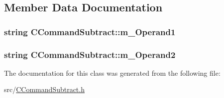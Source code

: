 \subsection{Member Data Documentation}
\subsubsection[{\texorpdfstring{m\+\_\+\+Operand1}{m_Operand1}}]{\setlength{\rightskip}{0pt plus 5cm}string C\+Command\+Subtract\+::m\+\_\+\+Operand1\hspace{0.3cm}{\ttfamily [private]}}\hypertarget{classCCommandSubtract_ac0de4d1a69b9467aa080b8b46635d458}{}\label{classCCommandSubtract_ac0de4d1a69b9467aa080b8b46635d458}
\subsubsection[{\texorpdfstring{m\+\_\+\+Operand2}{m_Operand2}}]{\setlength{\rightskip}{0pt plus 5cm}string C\+Command\+Subtract\+::m\+\_\+\+Operand2\hspace{0.3cm}{\ttfamily [private]}}\hypertarget{classCCommandSubtract_a2da0355a6682b78cb62992fbb6fba499}{}\label{classCCommandSubtract_a2da0355a6682b78cb62992fbb6fba499}


The documentation for this class was generated from the following file\+:\begin{DoxyCompactItemize}
\item 
src/\hyperlink{CCommandSubtract_8h}{C\+Command\+Subtract.\+h}\end{DoxyCompactItemize}

